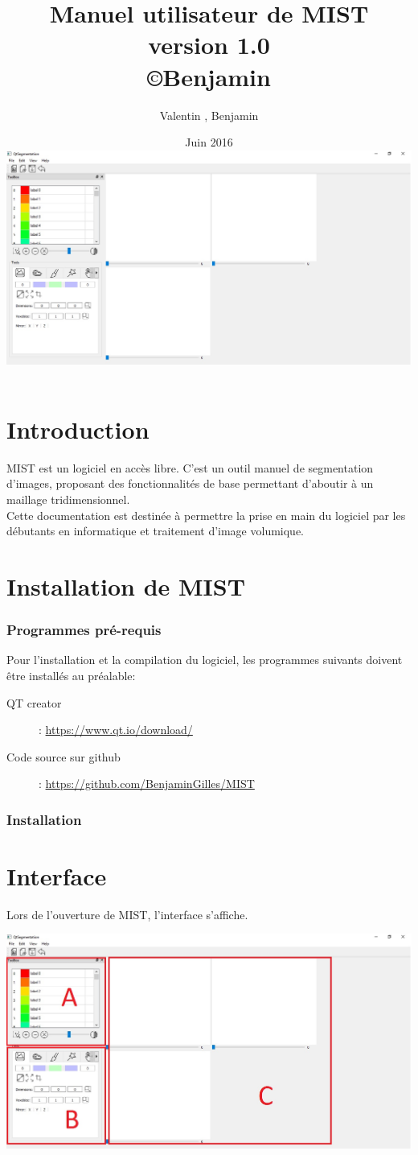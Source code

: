 \documentclass {article}
\title{Manuel utilisateur de MIST
\\
version 1.0
\\
\copyright Benjamin \bsc{gilles}}
\author{Valentin \bsc{favier}, Benjamin \bsc{gilles}}
\date{Juin 2016
\\
\includegraphics[scale=0.5]{Iconographie/Interface_vierge}}
\begin{document}
\maketitle
\newpage

\part{Introduction}

MIST est un logiciel en accès libre. C'est un outil manuel de segmentation d'images, proposant des fonctionnalités de base permettant d'aboutir à un maillage tridimensionnel.
\\
Cette documentation est destinée à permettre la prise en main du logiciel par les débutants en informatique et traitement d'image volumique.

\part{Installation de MIST}

\section{Programmes pré-requis}

Pour l'installation et la compilation du logiciel, les programmes suivants doivent être installés au préalable:
\begin{description}
\item[QT creator]: \url{https://www.qt.io/download/}
\item[Code source sur github]: \url{https://github.com/BenjaminGilles/MIST}
\end{description}

\section{Installation}

\part{Interface}

Lors de l'ouverture de MIST, l'interface s'affiche. 


	\begin{center}
				\includegraphics[scale=0.5]{Iconographie/Interface_fenetres}
	\end{center}
\end{document}
